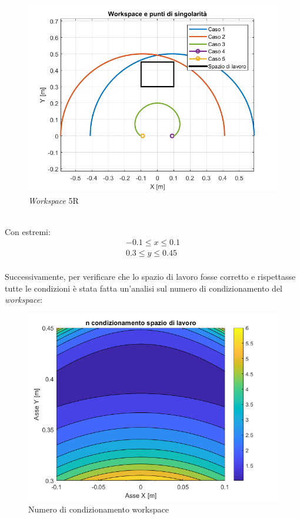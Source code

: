 \begin{figure}[ht]
	\begin{center}
		\includegraphics[scale=0.55]{Immagini/Singolarity/WorksingNew}
		\caption{\textit{Workspace} 5R}
	\end{center}
\end{figure}
\\Con estremi:
\begin{equation*}
	\begin{split}
		-0.1 \le x \le 0.1 \\
		0.3 \le y \le 0.45
	\end{split}
\end{equation*}
\\Successivamente, per verificare che lo spazio di lavoro fosse corretto e rispettasse tutte le condizioni è stata fatta un'analisi sul numero di condizionamento del \textit{workspace}:
\begin{figure}[ht]
	\begin{center}
		\includegraphics[scale=0.55]{Immagini/Singolarity/ncondsl}
		\caption{Numero di condizionamento workspace}
	\end{center}
\end{figure}
